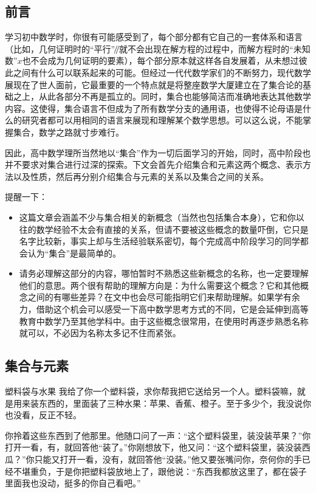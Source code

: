 
\begin{issues}
\issueDraft
\end{issues}

\subsection{前言}

学习初中数学时，你很有可能感受到了，每个部分都有它自己的一套体系和语言（比如，几何证明时的“平行”$\mathbin{\!/\mkern-5mu/\!}$就不会出现在解方程的过程中，而解方程时的“未知数”$x$也不会成为几何证明的要素），每个部分原本就这样各自发展着，从未想过彼此之间有什么可以联系起来的可能。但经过一代代数学家们的不断努力，现代数学展现在了世人面前，它最重要的一个特点就是将整座数学大厦建立在了集合论的基础之上，从此各部分不再是孤立的。同时，集合也能够简洁而准确地表达其他数学内容。这使得，集合语言不但成为了所有数学分支的通用语，也使得不论母语是什么的研究者都可以用相同的语言来展现和理解某个数学思想。可以这么说，不能掌握集合，数学之路就寸步难行。

因此，高中数学理所当然地以“集合”作为一切后面学习的开始，同时，高中阶段也并不要求对集合进行过深的探索。下文会首先介绍集合和元素这两个概念、表示方法以及性质，然后再分别介绍集合与元素的关系以及集合之间的关系。

提醒一下：
\begin{itemize}
\item 这篇文章会涵盖不少与集合相关的新概念（当然也包括集合本身），它和你以往的数学经验不太会有直接的关系，但请不要被这些概念的数量吓倒，它只是名字比较新，事实上却与生活经验联系密切，每个完成高中阶段学习的同学都会认为“集合”是最简单的。
\item 请务必理解这部分的内容，哪怕暂时不熟悉这些新概念的名称，也一定要理解他们的意思。两个很有帮助的理解方向是：为什么需要这个概念？它和其他概念之间的有哪些差异？在文中也会尽可能指明它们来帮助理解。如果学有余力，借助这个机会可以感受一下高中数学思考方式的不同，它是会延伸到高等教育中数学乃至其他学科中。由于这些概念很常用，在使用时再逐步熟悉名称就可以，不必因为名称太多记不住而紧张。
\end{itemize}

\subsection{集合与元素}

\begin{example}{塑料袋与水果}
我给了你一个塑料袋，求你帮我把它送给另一个人。塑料袋嘛，就是用来装东西的，里面装了三种水果：苹果、香蕉、橙子。至于多少个，我没说你也没看，反正不轻。

你拎着这些东西到了他那里。他随口问了一声：“这个塑料袋里，装没装苹果？”你打开一看，有，就回答他“装了。”你刚想放下，他又问：“这个塑料袋里，装没装西瓜？”你只能又打开一看，没有，就回答他“没装。”他又要张嘴问你，奈何你的手已经不堪重负，于是你把塑料袋放地上了，跟他说：“东西我都放这里了，都在袋子里面我也没动，挺多的你自己看吧。”
\end{example}

